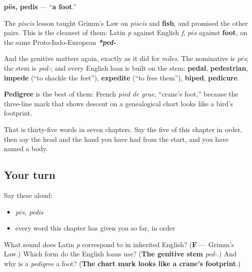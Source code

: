 \begin{cousinweb}
\textbf{pēs, pedis} — \textquotedblleft{}\textbf{a foot}.\textquotedblright{}

The \emph{piscis} lesson taught Grimm's Law on \emph{piscis} and \textbf{fish}, and promised the other pairs. This is the cleanest of them: Latin \emph{p} against English \emph{f}, \emph{pēs} against \textbf{foot}, on the same Proto-Indo-European \emph{\textbf{*ped-}}.

And the genitive matters again, exactly as it did for \emph{mīles}. The nominative is \emph{pēs}; the stem is \emph{ped-}; and every English loan is built on the stem: \textbf{pedal}, \textbf{pedestrian}, \textbf{impede} (\textquotedblleft{}to shackle the feet\textquotedblright{}), \textbf{expedite} (\textquotedblleft{}to free them\textquotedblright{}), \textbf{biped}, \textbf{pedicure}.

\textbf{Pedigree} is the best of them: French \emph{pied de grue}, \textquotedblleft{}crane's foot,\textquotedblright{} because the three-line mark that shows descent on a genealogical chart looks like a bird's footprint.

That is thirty-five words in seven chapters. Say the five of this chapter in order, then say the head and the hand you have had from the start, and you have named a body.
\end{cousinweb}

\subsection*{Your turn}
Say these aloud:

\begin{itemize}
\raggedright
  \item \emph{pēs, pedis}
  \item every word this chapter has given you so far, in order
\end{itemize}

\begin{tcolorbox}[breakable,colback=teal!4,colframe=teal!35!black,title={Before you move on}]
What sound does Latin \emph{p} correspond to in inherited English? (\textbf{F} — Grimm's Law.) Which form do the English loans use? (\textbf{The genitive stem} \emph{ped-}.) And why is a \emph{pedigree} a foot? (\textbf{The chart mark looks like a crane's footprint}.)
\end{tcolorbox}
